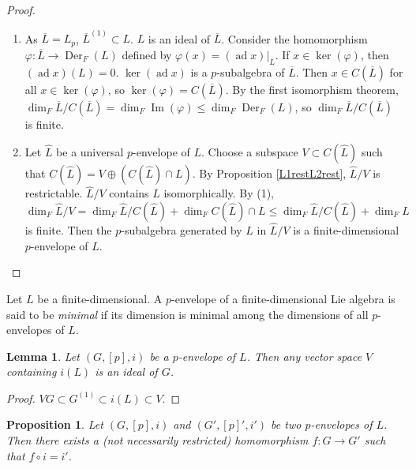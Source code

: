 \documentclass[12pt,MSc]{muthesis_2023}
\theoremstyle{plain}%
\newtheorem{Proposition}[FactCounter]{Proposition} %
\newtheorem{Lemma}[FactCounter]{Lemma} %
\theoremstyle{definition}
\theoremstyle{remark}
\DeclareMathOperator{\ad}{ad}
\DeclareMathOperator{\im}{Im}
\DeclareMathOperator{\Der}{Der}
\begin{document}
\begin{proof}
\begin{enumerate}
\item[(1)]
As $\overline{L}=L_p$, $\overline{L}^{(1)} \subset L$. $L$ is an ideal of $\overline{L}$. Consider the homomorphism $\varphi: \overline{L} \rightarrow \Der_F(L)$ defined by $\varphi(x)=(\ad x)|_L$. If $x \in \ker(\varphi)$, then $(\ad x)(L)=0$. $\ker (\ad x)$ is a $p$-subalgebra of $\overline{L}$. Then $x\in C(\overline{L})$ for all $x\in \ker(\varphi)$, so $\ker (\varphi)=C(\overline{L})$. By the first isomorphism theorem, $\dim_F \overline{L}/C(\overline{L})=\dim_F \im(\varphi)\leq \dim_F\Der_F(L)$, so $\dim_F \overline{L}/C(\overline{L})$ is finite.
\item[(2)]
Let $\widehat{L}$ be a universal $p$-envelope of $L$. Choose a subspace $V \subset C(\widehat{L})$ such that $C(\widehat{L})=V \oplus (C(\widehat{L})\cap L)$. By Proposition \ref{L1restL2rest}, $\widehat{L}/V$ is restrictable. $\widehat{L}/V$ contains $L$ isomorphically. By (1), $\dim_F \widehat{L}/V = \dim_F \widehat{L}/C(\widehat{L})+\dim_FC(\widehat{L})\cap L\leq \dim_F \widehat{L}/C(\widehat{L})+\dim_F L$ is finite. Then the $p$-subalgebra generated by $L$ in $\widehat{L}/V$ is a finite-dimensional $p$-envelope of $L$.
\end{enumerate}
\end{proof}

Let $L$ be a finite-dimensional. A $p$-envelope of a finite-dimensional Lie algebra is said to be \textit{minimal} if its dimension is minimal among the dimensions of all $p$-envelopes of $L$.

\begin{Lemma}\label{vectorspaceconiLhasidealofG}
Let $(G, [p], i)$ be a $p$-envelope of $L$. Then any vector space $V$ containing $i(L)$ is an ideal of $G$.
\end{Lemma}

\begin{proof}
$VG \subset G^{(1)} \subset i(L)\subset V$.
\end{proof}

\begin{Proposition}\label{twopenvelopeshomexist}
Let $(G, [p], i)$ and $(G', [p]', i')$ be two $p$-envelopes of $L$. Then there exists a (not necessarily restricted) homomorphism $f:G \rightarrow G'$ such that $f\circ i = i'$.
\end{Proposition}
\end{document}
